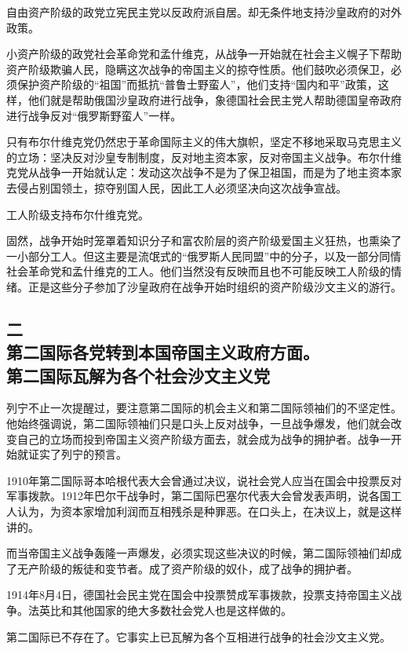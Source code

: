 自由资产阶级的政党立宪民主党以反政府派自居。却无条件地支持沙皇政府的对外政策。

小资产阶级的政党社会革命党和孟什维克，从战争一开始就在社会主义幌子下帮助资产阶级欺骗人民，隐瞒这次战争的帝国主义的掠夺性质。他们鼓吹必须保卫，必须保护资产阶级的“祖国”而抵抗“普鲁士野蛮人”，他们支持“国内和平”政策，这样，他们就是帮助俄国沙皇政府进行战争，象德国社会民主党人帮助德国皇帝政府进行战争反对“俄罗斯野蛮人”一样。

只有布尔什维克党仍然忠于革命国际主义的伟大旗帜，坚定不移地采取马克思主义的立场：坚决反对沙皇专制制度，反对地主资本家，反对帝国主义战争。布尔什维克党从战争一开始就认定：发动这次战争不是为了保卫祖国，而是为了地主资本家去侵占别国领土，掠夺别国人民，因此工人必须坚决向这次战争宣战。

工人阶级支持布尔什维克党。

固然，战争开始时笼罩着知识分子和富农阶层的资产阶级爱国主义狂热，也熏染了一小部分工人。但这主要是流氓式的“俄罗斯人民同盟”中的分子，以及一部分同情社会革命党和孟什维克的工人。他们当然没有反映而且也不可能反映工人阶级的情绪。正是这些分子参加了沙皇政府在战争开始时组织的资产阶级沙文主义的游行。


\subsection[二\q 第二国际各党转到本国帝国主义政府方面。第二国际瓦解为各个社会沙文主义党]{二\\第二国际各党转到本国帝国主义政府方面。\\第二国际瓦解为各个社会沙文主义党}

列宁不止一次提醒过，要注意第二国际的机会主义和第二国际领袖们的不坚定性。他始终强调说，第二国际领袖们只是口头上反对战争，一旦战争爆发，他们就会改变自己的立场而投到帝国主义资产阶级方面去，就会成为战争的拥护者。战争一开始就证实了列宁的预言。

1910年第二国际哥本哈根代表大会曾通过决议，说社会党人应当在国会中投票反对军事拨款。1912年巴尔干战争时，第二国际巴塞尔代表大会曾发表声明，说各国工人认为，为资本家增加利润而互相残杀是种罪恶。在口头上，在决议上，就是这样讲的。

而当帝国主义战争轰隆一声爆发，必须实现这些决议的时候，第二国际领袖们却成了无产阶级的叛徒和变节者。成了资产阶级的奴仆，成了战争的拥护者。

1914年8月4日，德国社会民主党在国会中投票赞成军事拨款，投票支持帝国主义战争。法英比和其他国家的绝大多数社会党人也是这样做的。

第二国际已不存在了。它事实上已瓦解为各个互相进行战争的社会沙文主义党。

